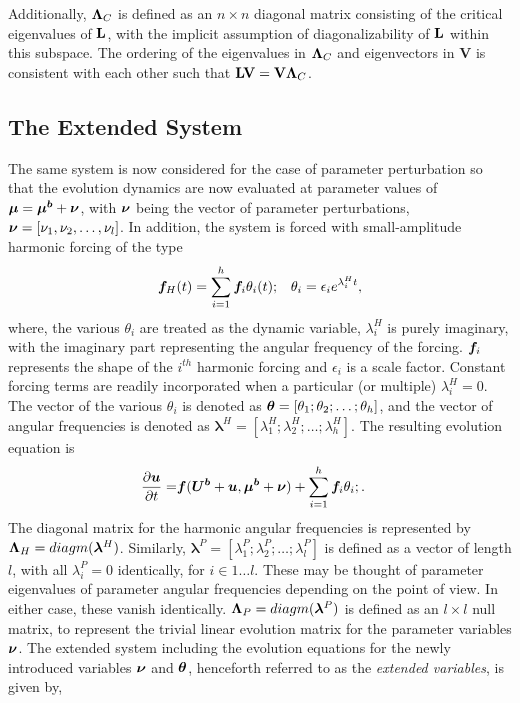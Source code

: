 Additionally, $\mathbf{\Lambda}_{C}$ is defined as an $n\times n$ diagonal matrix consisting of the critical eigenvalues of $\mathbf{L}$, with the implicit assumption of diagonalizability of $\mathbf{L}$ within this subspace. The ordering of the eigenvalues in $\mathbf{\Lambda}_{C}$ and eigenvectors in $\mathbf{V}$ is consistent with each other such that $\mathbf{L}\mathbf{V} = \mathbf{V}\mathbf{\Lambda}_{C}$. 


\subsection{The Extended System}
\label{sec:extended_system}

The same system is now considered for the case of parameter perturbation so that the evolution dynamics are now evaluated at parameter values of $\boldsymbol{\mu} = \boldsymbol{\mu^{b}} + \boldsymbol{\nu}$, with $\boldsymbol{\nu}$ being the vector of parameter perturbations, $\boldsymbol{\nu} = [\nu_{1},\nu_{2},\ldots,\nu_{l}]$. In addition, the system is forced with small-amplitude harmonic forcing of the type
\begin{align}
	\label{eqn:harmonic_forcing}
	\boldsymbol{f}_{H}(t) =\sum_{i=1}^{h}\boldsymbol{f}_{i}\theta_{i}(t); && \theta_{i} = \epsilon_{i}e^{\lambda^{H}_{i}t},
\end{align}
where, the various $\theta_{i}$ are treated as the dynamic variable, $\lambda^{H}_{i}$ is purely imaginary, with the imaginary part representing the angular frequency of the forcing. $\boldsymbol{f}_{i}$ represents the shape of the $i^{th}$ harmonic forcing and $\epsilon_{i}$ is a scale factor. Constant forcing terms are readily incorporated when a particular (or multiple) $\lambda^{H}_{i}=0$. The vector of the various $\theta_{i}$ is denoted as $\boldsymbol{\theta} = [\theta_{1};\theta_{2};\ldots;\theta_{h}]$, and the vector of angular frequencies is denoted as $\boldsymbol{\lambda}^{H} = [\lambda^{H}_{1};\lambda^{H}_{2};\ldots;\lambda^{H}_{h}]$. The resulting evolution equation is 
\begin{align}
	\frac{\partial \boldsymbol{u}}{\partial t} =& \boldsymbol{f}(\boldsymbol{U^{b}} + \boldsymbol{u},\boldsymbol{\mu^{b}} + \boldsymbol{\nu}) + \sum_{i=1}^{h}\boldsymbol{f}_{i}\theta_{i}; \nonumber.
\end{align}
The diagonal matrix for the harmonic angular frequencies is represented by $\mathbf{\Lambda}_{H} = diagm(\boldsymbol{\lambda}^{H})$. Similarly, $\boldsymbol{\lambda}^{P} = [\lambda^{P}_{1};\lambda^{P}_{2};\ldots;\lambda^{P}_{l}]$ is defined as a vector of length $l$, with all $\lambda^{P}_{i} = 0$ identically, for $i\in 1\ldots l$. These may be thought of parameter eigenvalues of parameter angular frequencies depending on the point of view. In either case, these vanish identically. $\mathbf{\Lambda}_{P} = diagm(\boldsymbol{\lambda}^{P})$ is defined as an $l\times l$ null matrix, to represent the trivial linear evolution matrix for the parameter variables $\boldsymbol{\nu}$. The extended system including the evolution equations for the newly introduced variables $\boldsymbol{\nu}$ and $\boldsymbol{\theta}$, henceforth referred to as the \emph{extended variables}, is given by,
